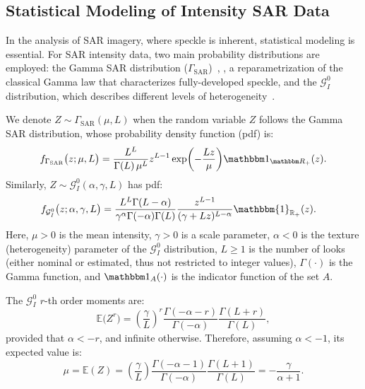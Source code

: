 \documentclass[
  lettersize  journal,
]{IEEEtran}%
\begin{document}
\subsection{Statistical Modeling of Intensity SAR
Data}\label{statistical-modeling-of-intensity-sar-data}

In the analysis of SAR imagery, where speckle is inherent, statistical
modeling is essential. For SAR intensity data, two main probability
distributions are employed: the Gamma SAR distribution
(\(\Gamma_{\mathrm{SAR}}\))~,
, a reparametrization of the classical
Gamma law that characterizes fully-developed speckle, and the
\(\mathcal{G}^0_I\) distribution, which describes different levels of
heterogeneity~.

We denote \(Z \sim \Gamma_{\mathrm{SAR}}(\mu,L)\) when the random
variable \(Z\) follows the Gamma SAR distribution, whose probability
density function (pdf) is: \begin{equation}
f_{\Gamma_{\mathrm{SAR}}}\bigl(z;\mu, L\bigr) 
= \frac{L^L}{\Gamma(L)\,\mu^L} z^{L-1} 
\exp \biggl(-\frac{Lz}{\mu}\biggr)
\mathbbm 1_{\mathbbm R_+}(z). \label{E:gamma1}
\end{equation} Similarly, \(Z \sim \mathcal{G}^0_I(\alpha,\gamma,L)\)
has pdf: \begin{align}
f_{\mathcal{G}^0_I}\bigl(z;  \alpha,\gamma, L \bigr) &=\frac{L^L\Gamma(L-\alpha)}{\gamma^{\alpha}\Gamma(-\alpha)\Gamma(L)}\frac{z^{L-1}}{(\gamma+Lz)^{L-\alpha}} \mathbbm{1}_{\mathbb{R}_+}(z). \label{E:gi01}
\end{align} Here, \(\mu > 0\) is the mean intensity, \(\gamma > 0\) is a
scale parameter, \(\alpha < 0\) is the texture (heterogeneity) parameter
of the \(\mathcal{G}^0_I\) distribution, \(L \geq 1\) is the number of
looks (either nominal or estimated, thus not restricted to integer
values), \(\Gamma(\cdot)\) is the Gamma function, and
\(\mathbbm 1_{A}(\cdot)\) is the indicator function of the set \(A\).

The \(\mathcal{G}_I^0\) \(r\)-th order moments are: \begin{equation}
\mathbb{E}\big(Z^r\big) = \left(\frac{\gamma}{L}\right)^r\frac{\Gamma(-\alpha-r)}{\Gamma(-\alpha)}\frac{\Gamma(L+r)}{\Gamma(L)}, 
\label{E:rmom}
\end{equation} provided that \(\alpha <-r\), and infinite otherwise.
Therefore, assuming \(\alpha<-1\), its expected value is:
\begin{equation}
\mu=\mathbb{E}(Z)=\left(\frac{\gamma}{L}\right)\frac{\Gamma(-\alpha-1)}{\Gamma(-\alpha)}\frac{\Gamma(L+1)}{\Gamma(L)}=-\frac{\gamma}{\alpha+1}.
\label{E:mean1}
\end{equation}
\end{document}
